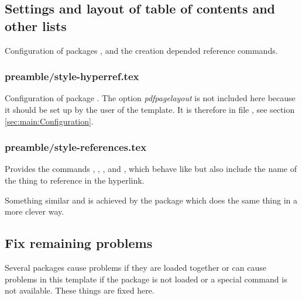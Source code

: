 \subsection{Settings and layout of table of contents and other lists}

Configuration of packages ,  and the creation  depended reference commands.


\subsubsection{preamble/style-hyperref.tex}

Configuration of package . The option \emph{pdfpagelayout} is not included here because it should be set up by the user of the template. It is therefore in file , see section \vref{sec:main:Configuration}.


\subsubsection{preamble/style-references.tex}

Provides the commands , , ,  and , which behave like  but also include the name of the thing to reference in the hyperlink.

Something similar and is achieved by the package  which does the same thing in a more clever way.


\subsection{Fix remaining problems}

Several packages cause problems if they are loaded together or can cause problems in this template if the package is not loaded or a special command is not available. These things are fixed here.

